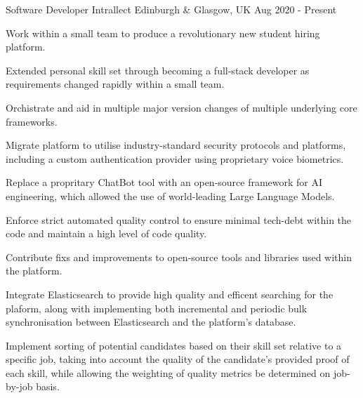 

\begin{cventries}

    \cventry
    {Software Developer}
    {Intrallect}
    {Edinburgh \& Glasgow, UK}
    {Aug 2020 - Present}
    {
        \begin{cvitems}
            \item {Work within a small team to produce a revolutionary new student hiring platform.}
            \item {Extended personal skill set through becoming a full-stack developer as requirements changed rapidly within a small team.}
            \item {Orchistrate and aid in multiple major version changes of multiple underlying core frameworks.}
            \item {Migrate platform to utilise industry-standard security protocols and platforms, including a custom authentication provider using proprietary voice biometrics.}
            \item {Replace a propritary ChatBot tool with an open-source framework for AI engineering, which allowed the use of world-leading Large Language Models.}
            \item {Enforce strict automated quality control to ensure minimal tech-debt within the code and maintain a high level of code quality.}
            \item {Contribute fixs and improvements to open-source tools and libraries used within the platform.}
            \item {Integrate Elasticsearch to provide high quality and efficent searching for the plaform, along with implementing both incremental and periodic bulk synchronisation between Elasticsearch and the platform's database.}
            \item {Implement sorting of potential candidates based on their skill set relative to a specific job, taking into account the quality of the candidate's provided proof of each skill, while allowing the weighting of quality metrics be determined on job-by-job basis.}
        \end{cvitems}
    }


\end{cventries}
